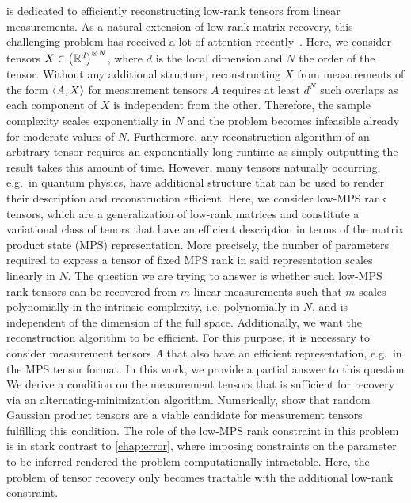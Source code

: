  is dedicated to efficiently reconstructing low-rank tensors from linear measurements.
As a natural extension of low-rank matrix recovery, this challenging problem has received a lot of attention recently~\cite{}.
Here, we consider tensors $X \in {\left({\mathbb{R}}^d\right)}^{\otimes N}$, where $d$ is the local dimension and $N$ the order of the tensor.
Without any additional structure, reconstructing $X$ from measurements of the form  $\braket{A, X}$ for measurement tensors $A$ requires at least $d^N$ such overlaps as each component of $X$ is independent from the other.
Therefore, the sample complexity scales exponentially in $N$ and the problem becomes infeasible already for moderate values of $N$.
Furthermore, any reconstruction algorithm of an arbitrary tensor requires an exponentially long runtime as simply outputting the result takes this amount of time.
However, many tensors naturally occurring, e.g.\ in quantum physics,  have additional structure that can be used to render their description and reconstruction efficient.
Here, we consider low-MPS rank tensors, which are a generalization of low-rank matrices and constitute a variational class of tenors that have an efficient description in terms of the matrix product state (MPS) representation.
More precisely, the number of parameters required to express a tensor of fixed MPS rank in said representation scales linearly in $N$.
The question we are trying to answer is whether such low-MPS rank tensors can be recovered from $m$ linear measurements such that $m$ scales polynomially in the intrinsic complexity, i.e.
 polynomially in $N$, and is independent of the dimension of the full space.
Additionally, we want the reconstruction algorithm to be efficient.
For this purpose, it is necessary to consider measurement tensors $A$ that also have an efficient representation, e.g.\ in the MPS tensor format.
In this work, we provide a partial answer to this question
We derive a condition on the measurement tensors that is sufficient for recovery via an alternating-minimization algorithm.
Numerically, show that random Gaussian product tensors are a viable candidate for measurement tensors fulfilling this condition.
The role of the low-MPS rank constraint in this problem is in stark contrast to \cref{chap:error}, where imposing constraints on the parameter to be inferred rendered the problem computationally intractable.
Here, the problem of tensor recovery only becomes tractable with the additional low-rank constraint.
